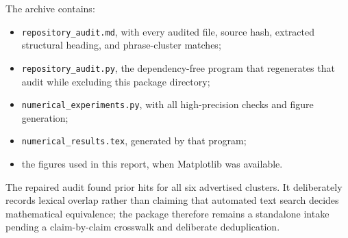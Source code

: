\documentclass[11pt,oneside]{article}
\theoremstyle{definition}
\theoremstyle{remark}
\begin{document}
The archive contains:
\begin{itemize}[leftmargin=2em]
\item \texttt{repository\_audit.md}, with every audited file, source hash,
      extracted structural heading, and phrase-cluster matches;
\item \texttt{repository\_audit.py}, the dependency-free program that
      regenerates that audit while excluding this package directory;
\item \texttt{numerical\_experiments.py}, with all high-precision checks and
      figure generation;
\item \texttt{numerical\_results.tex}, generated by that program;
\item the figures used in this report, when Matplotlib was available.
\end{itemize}
The repaired audit found prior hits for all six advertised clusters.  It
deliberately records lexical overlap rather than claiming that automated text
search decides mathematical equivalence; the package therefore remains a
standalone intake pending a claim-by-claim crosswalk and deliberate
deduplication.
\end{document}
